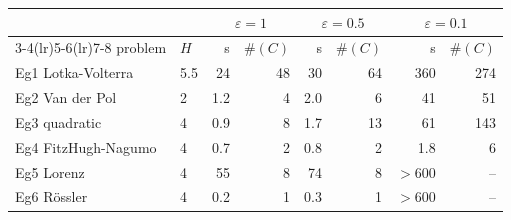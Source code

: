\begin{tabular}{llrrrrrr}
\toprule
& & \multicolumn{2}{c}{$\varepsilon=1$} & \multicolumn{2}{c}{$\varepsilon=0.5$} & \multicolumn{2}{c}{$\varepsilon=0.1$} \\
\cmidrule(lr){3-4}\cmidrule(lr){5-6}\cmidrule(lr){7-8}
problem & $H$ & s & $\#(C)$ & s & $\#(C)$ & s & $\#(C)$ \\
\midrule
Eg1 Lotka-Volterra & 5.5 & 24 & 48 & 30 & 64 & 360 & 274 \\
Eg2 Van der Pol & 2 & 1.2 & 4 & 2.0 & 6 & 41 & 51 \\
Eg3 quadratic & 4 & 0.9 & 8 & 1.7 & 13 & 61 & 143 \\
Eg4 FitzHugh-Nagumo & 4 & 0.7 & 2 & 0.8 & 2 & 1.8 & 6 \\
Eg5 Lorenz & 4 & 55 & 8 & 74 & 8 & $>$600 & -- \\
Eg6 R\"ossler & 4 & 0.2 & 1 & 0.3 & 1 & $>$600 & -- \\
\bottomrule
\end{tabular}
